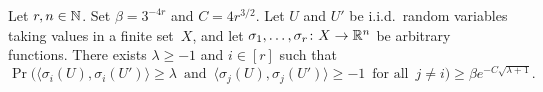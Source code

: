 \begin{lemma}
  \label{lem:substitution-geometric}
\end{lemma}



\begin{lemma}
  \label{lem:geometric} %
  Let $r, n\in\mathbb{N}$. Set $\beta = 3^{-4r}$ and $C = 4r^{3/2}$.
  Let\/ $U$ and\/ $U'$ be i.i.d.~random variables taking values in a finite set~$X$, and let $\sigma_1,\ldots,\sigma_r \colon X \rightarrow \mathbb{R}^n$ be arbitrary functions. There exists $\lambda\ge-1$ and\/ $i\in[r]$ such that
  $$\Pr\Big( \big\langle \sigma_i(U),\sigma_i(U') \big\rangle \ge \lambda \, \text{ and } \, \big\langle \sigma_j(U), \sigma_j(U') \big\rangle \ge -1 \, \text{ for all } \, j \ne i \Big) \ge \beta e^{- C\sqrt{\lambda + 1}}.$$
\end{lemma}

